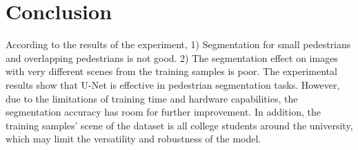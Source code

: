 \documentclass[12pt, a4paper]{article}
\begin{document}
	\section{Conclusion} \justify
	According to the results of the experiment, 1) Segmentation for small pedestrians and overlapping pedestrians is not good. 2) The segmentation effect on images with very different scenes from the training samples is poor. The experimental results show that U-Net is effective in pedestrian segmentation tasks. However, due to the limitations of training time and hardware capabilities, the segmentation accuracy has room for further improvement. In addition, the training samples' scene of the dataset is all college students around the university, which may limit the versatility and robustness of the model.

	\newpage
	
	  
	
	\let\oldthebibliography\thebibliography
	\let\endoldthebibliography\endthebibliography
	\renewenvironment{thebibliography}[1]
		{
	 	 \begin{oldthebibliography}{#1}
	    \setlength{\itemsep}{10.0em}
	    \setlength{\parskip}{10em}
		}{  \end{oldthebibliography} 
		}
\end{document}
